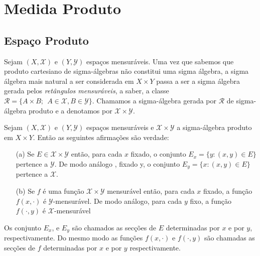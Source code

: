 \chapter[Aula 10]{Medida Produto}
\chaptermark{}

\section{Espaço Produto}

Sejam $(X, \mathscr{X})$ e $(Y, \mathscr{Y})$ espaços mensuráveis. 
Uma vez que sabemos que produto cartesiano de sigma-álgebras não 
constitui uma sigma álgebra, a sigma álgebra mais natural a ser 
considerada em $X\times Y$ passa a ser a sigma álgebra gerada pelos
\emph{retângulos mensuráveis}, a saber, a classe $\mathscr{R}=\{
A\times B;~~A\in \mathscr{X}, B\in \mathscr{Y}\}.$ Chamamos a 
sigma-álgebra gerada por $\mathscr{R}$ de sigma-álgebra produto e 
a denotamos por $\mathscr{X}\times \mathscr{Y}$.



\begin{proposicao}\label{Prod. 1}
Sejam $(X, \mathscr{X})$ e $(Y, \mathscr{Y})$ espaços mensuráveis e 
$\mathscr{X}\times \mathscr{Y}$ a sigma-álgebra produto em $X\times Y$.
Então as seguintes afirmações são verdade:
\begin{itemize}
\item[(a)] Se $E\in \mathscr{X}\times \mathscr{Y}$ então, para cada $x$ fixado,
 o conjunto $E_x=\{y: (x,y)\in E\}$ pertence a $\mathscr{Y}$. De modo análogo 
, fixado y,  o conjunto $E_y=\{x: (x,y)\in E\}$ pertence a $\mathscr{X}$.



\item[(b)] Se $f$ é uma função $\mathscr{X}\times \mathscr{Y}$ mensurável 
então, para cada $x$ fixado, a função $f(x, \cdot)$ é $\mathscr{Y}$-mensurável. De 
modo análogo, para cada $y$ fixo, a função $f(\cdot, y)$ é $\mathscr{X}$-mensurável
\end{itemize}
\end{proposicao}


Os conjunto $E_x$, e $E_y$ são chamados as secções de $E$ determinadas por $x$ e 
por $y$, respectivamente. Do mesmo modo as funções $f(x, \cdot)$ e $f(\cdot, y)$ 
são chamadas as secções de $f$ determinadas por $x$ e por $y$ respectivamente.
\medskip

